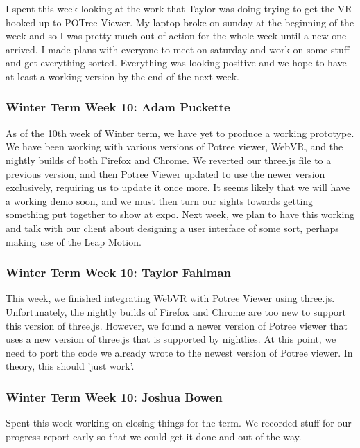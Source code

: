 \documentclass[draftclsnofoot,onecolumn]{IEEEtran}
\begin{document}
I spent this week looking at the work that Taylor was doing trying to get the VR hooked up to POTree Viewer. My laptop broke on sunday at the beginning of the week and so I was pretty much out of action for the whole week until a new one arrived. I made plans with everyone to meet on saturday and work on some stuff and get everything sorted. Everything was looking positive and we hope to have at least a working version by the end of the next week.

\subsubsection{Winter Term Week 10: Adam Puckette}

As of the 10th week of Winter term, we have yet to produce a working prototype. We have been working with various versions of Potree viewer, WebVR, and the nightly builds of both Firefox and Chrome. We reverted our three.js file to a previous version, and then Potree Viewer updated to use the newer version exclusively, requiring us to update it once more. It seems likely that we will have a working demo soon, and we must then turn our sights towards getting something put together to show at expo. Next week, we plan to have this working and talk with our client about designing a user interface of some sort, perhaps making use of the Leap Motion.

\subsubsection{Winter Term Week 10: Taylor Fahlman}

This week, we finished integrating WebVR with Potree Viewer using three.js. Unfortunately, the nightly builds of Firefox and Chrome are too new to support this version of three.js. However, we found a newer version of Potree viewer that uses a new version of three.js that is supported by nightlies. At this point, we need to port the code we already wrote to the newest version of Potree viewer. In theory, this should 'just work'.

\subsubsection{Winter Term Week 10: Joshua Bowen}

Spent this week working on closing things for the term. We recorded stuff for our progress report early so that we could get it done and out of the way.
\end{document}
